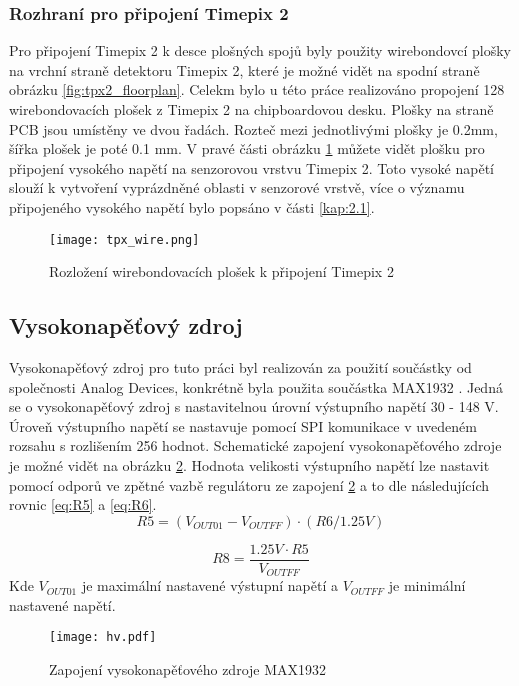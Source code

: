 	\subsubsection{Rozhraní pro připojení Timepix 2}	%
	Pro připojení Timepix 2 k desce plošných spojů byly použity wirebondovcí plošky na vrchní straně detektoru Timepix 2, které je možné vidět na spodní straně obrázku \ref{fig:tpx2_floorplan}. Celekm bylo u této práce realizováno propojení 128 wirebondovacích plošek z Timepix 2 na chipboardovou desku. Plošky na straně PCB jsou umístěny ve dvou řadách. Rozteč mezi jednotlivými plošky je 0.2mm, šířka plošek je poté 0.1 mm. V pravé části obrázku \ref{fig:tpx_wire} můžete vidět plošku pro připojení vysokého napětí na senzorovou vrstvu Timepix 2. Toto vysoké napětí slouží k vytvoření vyprázdněné oblasti v senzorové vrstvě, více o významu připojeného vysokého napětí bylo popsáno v části \ref{kap:2.1}. 
	\begin{figure}[h!]
		\centering
		\captionsetup{justification=centering}
		\texttt{[image: tpx\_wire.png]}
		\caption{Rozložení wirebondovacích plošek k připojení Timepix 2} 
		\label{fig:tpx_wire}
	\end{figure} 
	\subsection{Vysokonapěťový zdroj}	%
	\label{VN zdroj}
	Vysokonapěťový zdroj pro tuto práci byl realizován za použití součástky od společnosti Analog Devices, konkrétně byla použita součástka MAX1932 \cite{MAX1932}. Jedná se o vysokonapěťový zdroj s nastavitelnou úrovní výstupního napětí 30 - 148 V. Úroveň výstupního napětí se nastavuje pomocí SPI komunikace v uvedeném rozsahu s rozlišením 256 hodnot. Schematické zapojení vysokonapěťového zdroje je možné vidět na obrázku \ref{fig:hv}. Hodnota velikosti výstupního napětí lze nastavit pomocí odporů ve zpětné vazbě regulátoru ze zapojení \ref{fig:hv} a to dle následujících rovnic \ref{eq:R5} a \ref{eq:R6}. 
	\begin{equation}
		R5 = (V_{OUT01} - V_{OUTFF})\cdot (R6/1.25V)
		\label{eq:R5}
	\end{equation}

	\begin{equation}
		R8 = \frac{1.25V \cdot R5}{V_{OUTFF}}
		\label{eq:R6}
	\end{equation}
	Kde $V_{OUT01}$ je maximální nastavené výstupní napětí a $V_{OUTFF}$ je minimální nastavené napětí. 
	\begin{figure}[h!]
		\centering
		\captionsetup{justification=centering}
		\texttt{[image: hv.pdf]}
		\caption{Zapojení vysokonapěťového zdroje MAX1932} 
		\label{fig:hv}
	\end{figure} 
